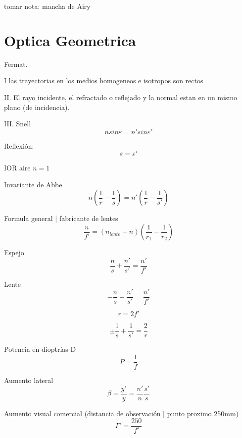 \documentclass[12pt, letterpaper, twoside]{article}
\begin{document}
	tomar nota: mancha de Airy
	
	\section{Optica Geometrica}
	
	Fermat.
	
	I las trayectorias en los medios homogeneos e isotropos son rectos
	
	II. El rayo incidente, el refractado o reflejado y la normal estan en un mismo plano (de incidencia).
	
	III. Snell
	\begin{equation}
		n sin \varepsilon = n' sin \varepsilon'
	\end{equation}

	Reflexión: 
	\begin{equation}
		\varepsilon = \varepsilon'
	\end{equation}
	
	IOR aire $n = 1$

	Invariante de Abbe
	\begin{equation}
		n ( \frac{1}{r} - \frac{1}{s} ) = n' (\frac{1}{r} - \frac{1}{s'} )
	\end{equation}

	Formula general | fabricante de lentes	
	\begin{equation}
		\frac{n}{f'} = (n_{lente} - n)(\frac{1}{r_1} - \frac{1}{r_2})
	\end{equation}

	Espejo
	\begin{equation}
		\frac{n}{s} + \frac{n'}{s'} = \frac{n'}{f'}
	\end{equation}

	Lente
	\begin{equation}
		-\frac{n}{s} + \frac{n'}{s'} = \frac{n'}{f'}
	\end{equation}

	\begin{equation}
		r = 2f'
	\end{equation}

	\begin{equation}
		\pm \frac{1}{s} + \frac{1}{s'} = \frac{2}{r}
	\end{equation}
	
	Potencia en dioptrías D
	\begin{equation}
		P = \frac{1}{f}
	\end{equation}
	
	Aumento lateral
	\begin{equation}
		\beta = \frac{y'}{y} = \frac{n'}{n} \frac{s'}{s}
	\end{equation}

	Aumento visual comercial (distancia de observación | punto proximo 250mm)
	\begin{equation}
		\Gamma' = \frac{250}{f'}
	\end{equation}
	
\end{document}

